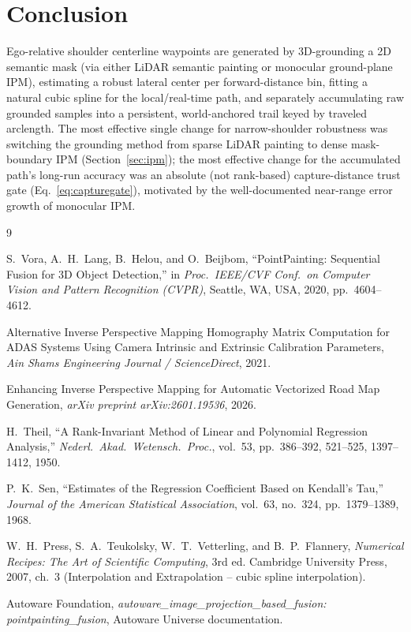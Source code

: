 \documentclass[11pt]{article}
\begin{document}
\section{Conclusion}

Ego-relative shoulder centerline waypoints are generated by 3D-grounding a 2D semantic mask (via
either LiDAR semantic painting or monocular ground-plane IPM), estimating a robust lateral center
per forward-distance bin, fitting a natural cubic spline for the local/real-time path, and
separately accumulating raw grounded samples into a persistent, world-anchored trail keyed by
traveled arclength. The most effective single change for narrow-shoulder robustness was switching
the grounding method from sparse LiDAR painting to dense mask-boundary IPM
(Section~\ref{sec:ipm}); the most effective change for the accumulated path's long-run accuracy was
an absolute (not rank-based) capture-distance trust gate (Eq.~\ref{eq:capturegate}), motivated by
the well-documented near-range error growth of monocular IPM.

\begin{thebibliography}{9}

S.~Vora, A.~H.~Lang, B.~Helou, and O.~Beijbom, ``PointPainting: Sequential Fusion for 3D Object
Detection,'' in \emph{Proc.\ IEEE/CVF Conf.\ on Computer Vision and Pattern Recognition (CVPR)},
Seattle, WA, USA, 2020, pp.\ 4604--4612.

Alternative Inverse Perspective Mapping Homography Matrix Computation for ADAS Systems Using
Camera Intrinsic and Extrinsic Calibration Parameters, \emph{Ain Shams Engineering Journal /
ScienceDirect}, 2021.

Enhancing Inverse Perspective Mapping for Automatic Vectorized Road Map Generation, \emph{arXiv
preprint arXiv:2601.19536}, 2026.

H.~Theil, ``A Rank-Invariant Method of Linear and Polynomial Regression Analysis,'' \emph{Nederl.\
Akad.\ Wetensch.\ Proc.}, vol.\ 53, pp.\ 386--392, 521--525, 1397--1412, 1950.

P.~K.~Sen, ``Estimates of the Regression Coefficient Based on Kendall's Tau,'' \emph{Journal of
the American Statistical Association}, vol.\ 63, no.\ 324, pp.\ 1379--1389, 1968.

W.~H.~Press, S.~A.~Teukolsky, W.~T.~Vetterling, and B.~P.~Flannery, \emph{Numerical Recipes: The
Art of Scientific Computing}, 3rd ed. Cambridge University Press, 2007, ch.\ 3 (Interpolation and
Extrapolation -- cubic spline interpolation).

Autoware Foundation, \emph{autoware\_image\_projection\_based\_fusion: pointpainting\_fusion},
Autoware Universe documentation.

\end{thebibliography}
\end{document}
